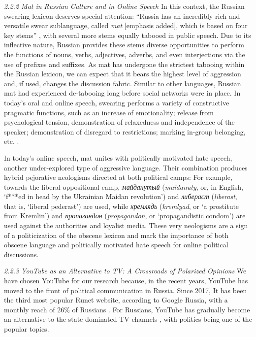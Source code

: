 \textit{2.2.2 Mat in Russian Culture and in Online Speech} 
In this context, the Russian swearing lexicon deserves special attention: “Russia has an incredibly rich and versatile swear sublanguage, called \textit{mat} [emphasis added], which is based on four key stems” \cite{Pilkington,PluzerSarno}, with several more stems equally tabooed in public speech. Due to its inflective nature, Russian provides these stems diverse opportunities to perform the functions of nouns, verbs, adjectives, adverbs, and even interjections via the use of prefixes and suffixes. As mat has undergone the strictest tabooing within the Russian lexicon, we can expect that it bears the highest level of aggression and, if used, changes the discussion fabric. Similar to other languages, Russian mat had experienced de-tabooing long before social networks were in place. In today’s oral and online speech, swearing performs a variety of constructive pragmatic functions, such as an increase of emotionality; release from psychological tension, demonstration of relaxedness and independence of the speaker; demonstration of disregard to restrictions; marking in-group belonging, etc. \cite[p.~37]{Kosov}.

In today’s online speech, mat unites with politically motivated hate speech, another under-explored type of aggressive language. Their combination produces hybrid pejorative neologisms directed at both political camps: For example, towards the liberal-oppositional camp, \textit{майданутый} (\textit{maidanuty}, or, in English, ‘f***ed in head by the Ukrainian Maidan revolution’) and \textit{либераст} (\textit{liberast}, that is, ‘liberal pederast’) are used, while \textit{кремлядь} (\textit{kremlyad}, or ‘a prostitute from Kremlin’) and \textit{пропагандон} (\textit{propagandon}, or ‘propagandistic condom’) are used against the authorities and loyalist media. These very neologisms are a sign of a politicization of the obscene lexicon and mark the importance of both obscene language and politically motivated hate speech for online political discussions.

\textit{2.2.3 YouTube as an Alternative to TV: A Crossroads of Polarized Opinions}
We have chosen YouTube for our research because, in the recent years, YouTube has moved to the front of political communication in Russia. Since 2017, It has been the third most popular Runet website, according to Google Russia, with a monthly reach of 26\% of Russians \cite{Polyakova}. For Russians, YouTube has gradually become an alternative to the state-dominated TV channels \cite{Litvinenko2018}, with politics being one of the popular topics.

